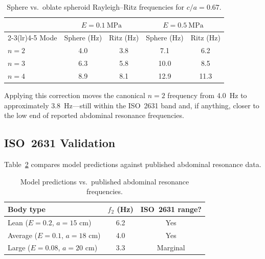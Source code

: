 \begin{table}[htbp]
  \centering
  \caption{Sphere vs.\ oblate spheroid Rayleigh--Ritz frequencies for $c/a = 0.67$.}
  \label{tab:oblate_correction}
  \begin{tabular}{lcccc}
    \toprule
    & \multicolumn{2}{c}{$E = \SI{0.1}{\mega\pascal}$}
    & \multicolumn{2}{c}{$E = \SI{0.5}{\mega\pascal}$} \\
    \cmidrule(lr){2-3}\cmidrule(lr){4-5}
    Mode & Sphere (Hz) & Ritz (Hz) & Sphere (Hz) & Ritz (Hz) \\
    \midrule
    $n=2$ & 4.0 & 3.8 & 7.1 & 6.2 \\
    $n=3$ & 6.3 & 5.8 & 10.0 & 8.5 \\
    $n=4$ & 8.9 & 8.1 & 12.9 & 11.3 \\
    \bottomrule
  \end{tabular}
\end{table}

Applying this correction moves the canonical $n=2$ frequency from
\SI{4.0}{\hertz} to approximately \SI{3.8}{\hertz}---still within the
ISO~2631 band and, if anything, closer to the low end of reported abdominal
resonance frequencies.

\subsection{ISO~2631 Validation}

Table~\ref{tab:iso} compares model predictions against published abdominal
resonance data.

\begin{table}[htbp]
  \centering
  \caption{Model predictions vs.\ published abdominal resonance frequencies.}
  \label{tab:iso}
  \begin{tabular}{lcc}
    \hline
    Body type & $f_2$ (Hz) & ISO~2631 range? \\
    \hline
    Lean ($E = 0.2$, $a = 15$ cm) & 6.2 & Yes \\
    Average ($E = 0.1$, $a = 18$ cm) & 4.0 & Yes \\
    Large ($E = 0.08$, $a = 20$ cm) & 3.3 & Marginal \\
    \hline
  \end{tabular}
\end{table}
